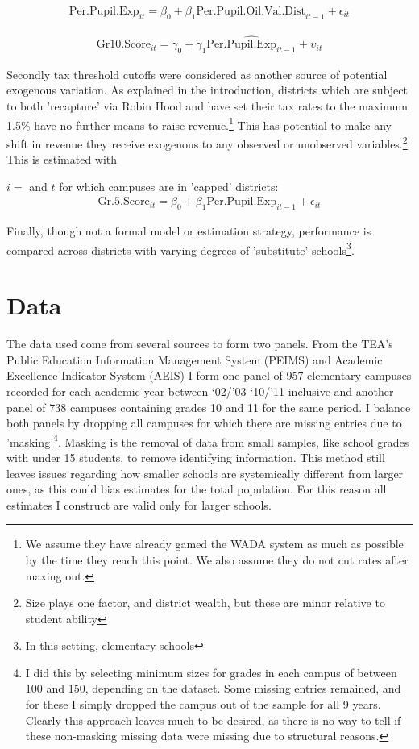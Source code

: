 \documentclass[11pt]{article}
\begin{document}
\begin{align*}
\mathrm{Per.Pupil.Exp}_{it} = \beta_{0} + \beta_{1}  \mathrm{Per.Pupil.Oil.Val.Dist}_{it-1} + \epsilon_{it}
\end{align*}

\begin{align*}
\mathrm{Gr10.Score}_{it} = \gamma_{0} + \gamma_{1}  \widehat{\mathrm{Per.Pupil.Exp}_{it-1}} + \upsilon_{it}
\end{align*}

Secondly tax threshold cutoffs were considered as another source of potential exogenous variation. As explained in the introduction, districts which are subject to both 'recapture' via Robin Hood and have set their tax rates to the maximum 1.5\% have no further means to raise revenue.\footnote{We assume they have already gamed the WADA system as much as possible by the time they reach this point. We also assume they do not cut rates after maxing out.} This has potential to make any shift in revenue they receive exogenous to any observed or unobserved variables.\footnote{Size plays one factor, and district wealth, but these are minor relative to student ability}. This is estimated with 

$i=$ and $t$ for which campuses are in 'capped' districts:
\begin{align*}
\mathrm{Gr.5.Score}_{it} = \beta_{0} + \beta_{1}  \mathrm{Per.Pupil.Exp}_{it-1} + \epsilon_{it}
\end{align*}

Finally, though not a formal model or estimation strategy, performance is compared across districts with varying degrees of 'substitute' schools\footnote{In this setting, elementary schools}.

\section{Data}

The data used come from several sources to form two panels. From the TEA’s Public Education Information Management System (PEIMS) and Academic Excellence Indicator System (AEIS) I form one panel of 957 elementary campuses recorded for each academic year between ‘02/’03-‘10/’11 inclusive and another panel of 738 campuses containing grades 10 and 11 for the same period.  I balance both panels by dropping all campuses for which there are missing entries due to 'masking'\footnote{I did this by selecting minimum sizes for grades in each campus of between 100 and 150, depending on the dataset. Some missing entries remained, and for these I simply dropped the campus out of the sample for all 9 years. Clearly this approach leaves much to be desired, as there is no way to tell if these non-masking missing data were missing due to structural reasons.}. Masking is the removal of data from small samples, like school grades with under 15 students, to remove identifying information. This method still leaves issues regarding how smaller schools are systemically different from larger ones, as this could bias estimates for the total population. For this reason all estimates I construct are valid only for larger schools.  
\end{document}
